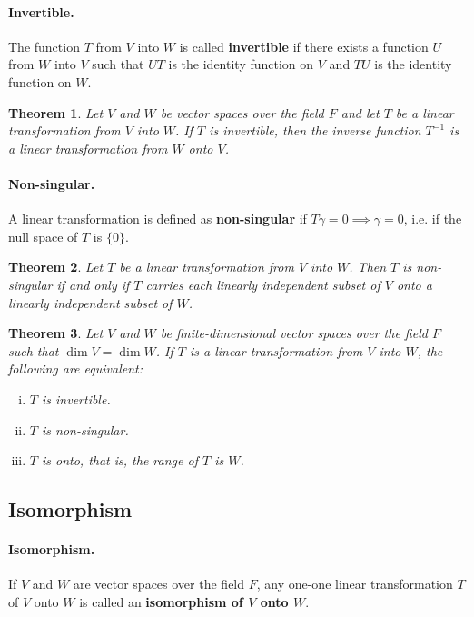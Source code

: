 \documentclass{article}
\newtheorem{theorem}{Theorem}[section]
\begin{document}
\paragraph{Invertible.} The function $T$ from $V$ into $W$ is called
\textbf{invertible} if there exists a function $U$ from $W$ into $V$ such that
$UT$ is the identity function on $V$ and $TU$ is the identity function on $W$.

\begin{theorem}
  Let $V$ and $W$ be vector spaces over the field $F$ and let $T$ be a linear
  transformation from $V$ into $W$. If $T$ is invertible, then the inverse
  function $T^{-1}$ is a linear transformation from $W$ onto $V$.
\end{theorem}

\paragraph{Non-singular.} A linear transformation is defined as
\textbf{non-singular} if $T\gamma = 0 \implies \gamma = 0$, i.e. if the null
space of $T$ is $\{0\}$.

\begin{theorem}
  Let $T$ be a linear transformation from $V$ into $W$. Then $T$ is non-singular
  if and only if $T$ carries each linearly independent subset of $V$ onto a
  linearly independent subset of $W$.
\end{theorem}

\begin{theorem}
  Let $V$ and $W$ be finite-dimensional vector spaces over the field $F$ such
  that $\dim V = \dim W$. If $T$ is a linear transformation from $V$ into $W$,
  the following are equivalent:
  \begin{enumerate}[(i)]
    \item $T$ is invertible.
    \item $T$ is non-singular.
    \item $T$ is onto, that is, the range of $T$ is $W$.
  \end{enumerate}
\end{theorem}

\subsection{Isomorphism}

\paragraph{Isomorphism.} If $V$ and $W$ are vector spaces over the field $F$,
any one-one linear transformation $T$ of $V$ onto $W$ is called an
\textbf{isomorphism of $V$ onto $W$}.
\end{document}
